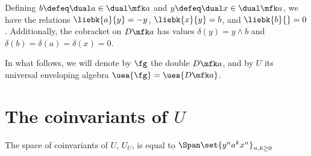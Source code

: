 \documentclass{article}
\begin{document}
Defining $b \defeq \dual a \in \dual\fa$ and $y \defeq \dual x \in \dual\fa$, we
have the relations $\liebk{a}{y}=-y$, $\liebk{x}{y}=b$, and $\liebk{b}{}=0$.
Additionally, the cobracket on $D\fa$ has values $δ(y) = y \wedge b$ and $δ(b) =
δ(a) = δ(x) = 0$.

In what follows, we will denote by $\fg$ the double $D\fa$, and by $U$ its
universal enveloping algebra $\uea{\fg} = \uea{D\fa}$.

\section{The coinvariants of $U$}

\begin{theorem}
        The space of coinvariants of $U$, $U_U$, is equal to
        $\Span\set{y^n a^k x^n}_{n, k\ge 0}$
\end{theorem}
\end{document}

